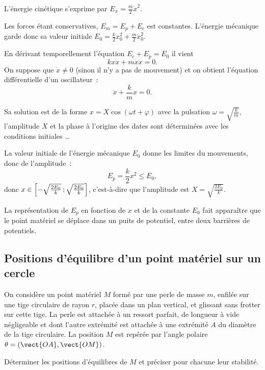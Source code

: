 L'énergie cinétique s'exprime par $E_x = \frac{m}{2} \dot{x}^2$.

Les forces étant conservatives, $E_m=E_p+E_c$ est constantes. L'énergie mécanique garde donc sa valeur initiale $E_0=\frac{k}{2}x_0^2 + \frac{m}{2}\dot{x}_0^2$.

En dérivant temporellement l'équation $E_c+E_p=E_0$ il vient
\begin{equation}
  k x \dot{x} +m \dot{x}\ddot{x} =0.
\end{equation}
On suppose que $\dot{x} \neq 0$ (sinon il n'y a pas de mouvement) et on obtient l'équation différentielle d'un oscillateur~:
\begin{equation}
  \ddot{x} + \frac{k}{m}x=0.
\end{equation}

Sa solution est de la forme $x=X\cos(\omega t +\varphi)$ avec la pulsation $\omega = \sqrt{\frac{k}{m}}$, l'amplitude $X$ et la phase à l'origine des dates sont déterminées avec les conditions initiales \ldots

La valeur initiale de l'énergie mécanique $E_0$ donne les limites du mouvements, donc de l'amplitude~:
\begin{equation}
  E_p=\frac{k}{2}x^2 \leq E_0,
\end{equation}
donc $x \in \left[ -\sqrt{\frac{2E_0}{k}} \, ;  \sqrt{\frac{2E_0}{k}} \right]$, c'est-à-dire que l'amplitude est $X=\sqrt{\frac{2E_0}{k}}$.

La représentation de $E_p$ en fonction de $x$ et de la constante $E_0$ fait apparaître que le point matériel se déplace dans un puits de potentiel, entre deux barrières de potentiels.

\subsection{Positions d'équilibre d'un point matériel sur un cercle}
\label{chap4-subsec:positionsdequilibredunpointsuruncercle}

On considère un point matériel $M$ formé par une perle de masse $m$, enfilée sur une tige circulaire de rayon $r$, placée dans un plan vertical, et glissant sans frotter sur cette tige. La perle est attachée à un ressort parfait, de longueur à vide négligeable et dont l'autre extrémité est attachée à une extrémité $A$ du diamètre de la tige circulaire. La position $M$ est repérée par l'angle polaire $\theta = (\vect{OA}, \vect{OM})$. 

Déterminer les positions d'équilibres de $M$ et préciser pour chacune leur stabilité.

